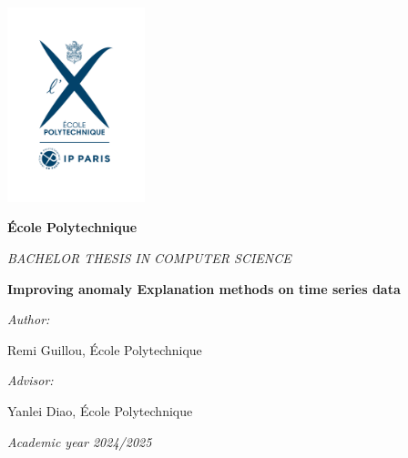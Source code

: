 \documentclass[oneside, a4paper, onecolumn, 11pt]{article}
\newcommand{\thesistitle}[0]{Improving anomaly Explanation methods on time series data}
\newcommand{\authorname}[0]{Remi Guillou}
\newcommand{\supervisor}[0]{Yanlei Diao}
\newcommand{\supervisorinstitution}[0]{École Polytechnique}
\begin{document}



\hspace{0pt}
\vfill

\begin{center}

\includegraphics[width=0.3\textwidth]{images/logo-EP-vertical}

\vspace*{2em}
%
{\large
\textbf{\'Ecole Polytechnique}

\vspace*{1em}
\textit{BACHELOR THESIS IN COMPUTER SCIENCE}


\vspace*{3em}
{\Huge \textbf{\thesistitle}}
\vspace*{3em}



\textit{Author:}

\vspace*{1em}
\authorname{}, \'Ecole Polytechnique

\vspace*{2em}
%
{\textit{Advisor:}}

\vspace*{1em}
\supervisor{}, \supervisorinstitution{}
}

\vspace*{2em}
\textit{Academic year 2024/2025}

\end{center}

\vfill
\hspace{0pt}
\end{document}
